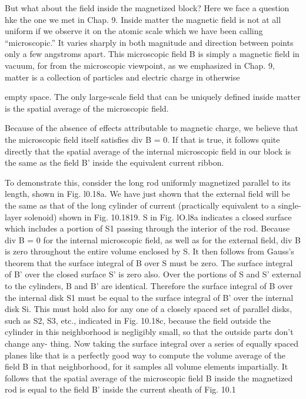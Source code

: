 {{But what about the field inside the magnetized block? Here we
face a question hke the one we met in Chap. 9. Inside matter the
magnetic field is not at all uniform if we observe it on the atomic
scale which we have been calling ``microscopic.'' It varies sharply
in both magnitude and direction between points only a few angstroms
apart. This microscopic field B is simply a magnetic field in vacuum,
for from the microscopic viewpoint, as we emphasized in Chap. 9,
matter is a collection of particles and electric charge in otherwise

empty space. The only large-scale field that can be uniquely defined
inside matter is the spatial average of the microscopic field.

Because of the absence of effects attributable to magnetic charge,
we believe that the microscopic field itself satisfies div B = 0. If that
is true, it follows quite directly that the spatial average of the internal
microscopic field in our block is the same as the field B' inside the
equivalent current ribbon.

To demonstrate this, consider the long rod uniformly magnetized
parallel to its length, shown in Fig. l0.18a. We have just shown that
the external field will be the same as that of the long cylinder of current
(practically equivalent to a single-layer solenoid) shown in
Fig. 10.1819. S in Fig. lO.l8a indicates a closed surface which includes
a portion of S1 passing through the interior of the rod.
Because div B = 0 for the internal microscopic field, as well as for
the external field, div B is zero throughout the entire volume enclosed
by S. It then follows from Gauss's theorem that the surface integral
of B over S must be zero. The surface integral of B' over the closed
surface S' is zero also. Over the portions of S and S' external to the
cylinders, B and B' are identical. Therefore the surface integral of B
over the internal disk S1 must be equal to the surface integral of B'
over the internal disk Si. This must hold also for any one of a closely
spaced set of parallel disks, such as S2, S3, etc., indicated in
Fig. 10.18c, because the field outside the cylinder in this neighborhood
is negligibly small, so that the outside parts don't change any-
thing. Now taking the surface integral over a series of equally spaced
planes like that is a perfectly good way to compute the volume
average of the field B in that neighborhood, for it samples all volume
elements impartially. It follows that the spatial average of the microscopic
field B inside the magnetized rod is equal to the field B' inside
the current sheath of Fig. 10.1%

}}
